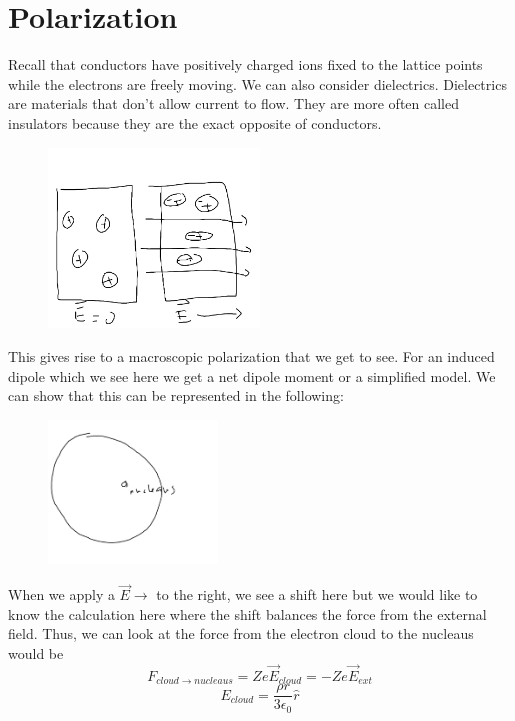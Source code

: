 \section{Polarization}
Recall that conductors have positively charged ions fixed to the lattice points while the electrons are freely moving. We can also consider dielectrics. Dielectrics are materials that don't allow current to flow. They are more often called insulators because they are the exact opposite of conductors.
\begin{figure}[H]
    \centering
    \includegraphics[width=0.5\textwidth]{Figures/10.png}
    \caption{}
    \label{fig:}
\end{figure}
This gives rise to a macroscopic polarization that we get to see. For an induced dipole which we see here we get a net dipole moment or a simplified model. 
We can show that this can be represented in the following:
\begin{figure}[H]
    \centering
    \includegraphics[width=0.4\textwidth]{Figures/11.png}
    \caption{}
    \label{fig:}
\end{figure}
When we apply a \(\vec{E} \to \) to the right, we see a shift here but we would like to know the calculation here where the shift balances the force from the external field. Thus, we can look at the force from the electron cloud to the nucleaus would be 
\[
    F_{cloud \to  nucleaus} = Ze \vec{E}_{cloud} = -Ze \vec{E}_{ext}  
\]
\[
    E_{cloud} = \frac{\rho r}{3 \epsilon _0} \hat{r} 
\]